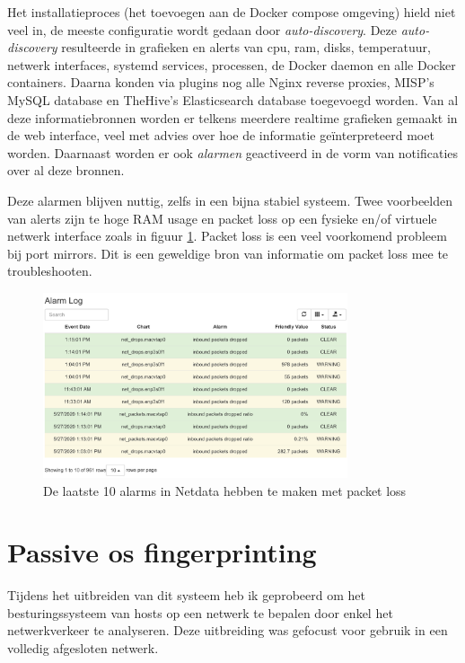 \documentclass[a4paper,12pt]{report}
\begin{document}
Het installatieproces (het toevoegen aan de Docker compose omgeving) hield niet veel in, de meeste configuratie wordt gedaan door \emph{auto-discovery}.
Deze \emph{auto-discovery} resulteerde in grafieken en alerts van cpu, ram, disks, temperatuur, netwerk interfaces, systemd services, processen, de Docker daemon en alle Docker containers.
Daarna konden via plugins nog alle Nginx reverse proxies, MISP's MySQL database en TheHive's Elasticsearch database toegevoegd worden.
Van al deze informatiebronnen worden er telkens meerdere realtime grafieken gemaakt in de web interface, veel met advies over hoe de informatie geïnterpreteerd moet worden.
Daarnaast worden er ook \emph{alarmen} geactiveerd in de vorm van notificaties over al deze bronnen.

Deze alarmen blijven nuttig, zelfs in een bijna stabiel systeem.
Twee voorbeelden van alerts zijn te hoge RAM usage en packet loss op een fysieke en/of virtuele netwerk interface zoals in figuur \ref{fig:netdata-packet-loss}.
Packet loss is een veel voorkomend probleem bij port mirrors.
Dit is een geweldige bron van informatie om packet loss mee te troubleshooten.

\begin{figure}[H]
  \centering
  \includegraphics[width=0.8\textwidth]{netdata-packet-loss}
  \caption{De laatste 10 alarms in Netdata hebben te maken met packet loss}
  \label{fig:netdata-packet-loss}
\end{figure}

\section{Passive os fingerprinting}
Tijdens het uitbreiden van dit systeem heb ik geprobeerd om het besturingssysteem van hosts op een netwerk te bepalen door enkel het netwerkverkeer te analyseren.
Deze uitbreiding was gefocust voor gebruik in een volledig afgesloten netwerk.
\end{document}
